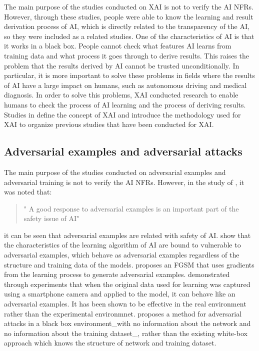 \documentclass[journal,article,submit,moreauthors,pdftex]{Definitions/mdpi}
\begin{document}
The main purpose of the studies conducted on XAI is not to verify the AI NFRs.
However, through these studies, people were able to know the learning and result derivation process of AI, which is directly related to the transparency of the AI, so they were included as a related studies.
One of the characteristics of AI is that it works in a black box. People cannot check what features AI learns from training data and what process it goes through to derive results.
This raises the problem that the results derived by AI cannot be trusted unconditionally.
In particular, it is more important to solve these problems in fields where the results of AI have a large impact on humans, such as autonomous driving and medical diagnosis.
In order to solve this problems, XAI conducted research to enable humans to check the process of AI learning and the process of deriving results.
Studies in \cite{xai-samek, xai-arrieta,ai-medical-xai-holzinger,xai-transparency-ribeiro,xai-transparency-murdoch} define the concept of XAI and introduce the methodology used for XAI to organize previous studies that have been conducted for XAI.

\subsection{Adversarial examples and adversarial attacks}

The main purpose of the studies conducted on adversarial examples and adversarial training is not to verify the AI NFRs.
However, in the study of \cite{adversarial-kurakin}, it was noted that:
\begin{quote}
   " A good response to adversarial examples is an important part of the safety issue of AI"
\end{quote}
it can be seen that adversarial examples are related with safety of AI.
\cite{adversarial-szegedy,adversarial-goodfellow} show that the characteristics of the learning algorithm of AI are bound to vulnerable to adversarial examples, which behave as adversarial examples regardless of the structure and training data of the models.
\cite{adversarial-goodfellow} proposes an FGSM that uses gradients from the learning process to generate adversarial examples.
\cite{adversarial-kurakin2} demonstrated through experiments that when the original data used for learning was captured using a smartphone camera and applied to the model, it can behave like an adversarial examples. It has been shown to be effective in the real environment rather than the experimental environmnet.
\cite{adversarial-papernot} proposes a method for adversarial attacks in a black box environment\_with no information about the network and no information about the training dataset\_, rather than the existing white-box approach which knows the structure of network and training dataset.
\end{document}
